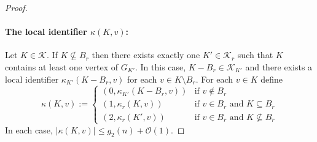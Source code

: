 \documentclass{patmorin}
\renewcommand{\le}{\leqslant}
\newcommand{\Oh}{\mathcal{O}}
\begin{document}
\begin{proof}
    \paragraph{\boldmath The local identifier $\kappa(K,v)$:}
    Let $K\in\mathcal{K}$.
    If $K\not\subseteq B_r$ then there exists exactly one $K'\in \mathcal{K}_r$ such that $K$ contains at least one vertex of $G_{K'}$.
    In this case, $K-B_r\in \mathcal{K}_{K'}$ and there exists a local identifier $\kappa_{K'}(K-B_r,v)$ for each $v\in K\setminus B_r$.
    For each $v\in K$ define
    \[
     \kappa(K,v):=
     \begin{cases}
       (0,\kappa_{K'}(K-B_r,v)) & \text{if $v\not\in B_r$} \\
       (1,\kappa_r(K,v)) & \text{if $v\in B_r$ and $K\subseteq B_r$} \\
       (2,\kappa_r(K',v)) & \text{if $v\in B_r$ and $K\not\subseteq B_r$}
     \end{cases}
     \]
     In each case, $|\kappa(K,v)|\le g_2(n)+\Oh(1)$.


\end{proof}
\end{document}
